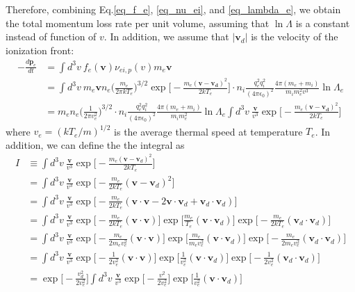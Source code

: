 \documentclass{article}
\begin{document}
Therefore, combining Eq.\ref{eq_f_e}, \ref{eq_nu_ei}, and \ref{eq_lambda_e}, we obtain the total momentum loss rate per unit volume, assuming that $\ln \Lambda$ is a constant instead of function of $v$. In addition, we assume that $|\bm{v}_d|$ is the velocity of the ionization front:
\begin{equation}
	\begin{split}
		-\frac{d \bm{p}_e}{d t} &= \int d^3v\ f_e(\bm{v}) \nu_{ei,p} (v) m_e \bm{v}\\
		&= \int d^3v\ m_e\bm{v} n_e \Big(\frac{m_e}{2\pi kT_e} \Big)^{3/2} \exp\Big[-\frac{m_e(\bm{v} - \bm{v_d})^2}{2kT_e} \Big] \cdot n_i\frac{q_e^2 q_i^2}{(4\pi \epsilon_0 )^2}\frac{4\pi(m_e+m_i)}{m_i m_e^2 v^3} \ln \Lambda_e \\
		&= m_e n_e \Big(\frac{1}{2\pi v_e^2} \Big)^{3/2} \cdot n_i\frac{q_e^2 q_i^2}{(4\pi \epsilon_0 )^2}\frac{4\pi(m_e+m_i)}{m_i m_e^2} \ln \Lambda_e \int d^3v\ \frac{\bm{v}}{v^3} \exp\Big[-\frac{m_e(\bm{v} - \bm{v_d})^2}{2kT_e} \Big] 
	\end{split}
\end{equation}
where $v_e = (kT_e/m )^{1/2}$ is the average thermal speed at temperature $T_e$. In addition, we can define the the integral as
\begin{equation}
	\begin{split}
		I &\equiv \int d^3v\ \frac{\bm{v}}{v^3} \exp\Big[-\frac{m_e(\bm{v} - \bm{v}_d)^2}{2kT_e} \Big] \\
		&= \int d^3v\ \frac{\bm{v}}{v^3} \exp\Big[-\frac{m_e}{2kT_e}(\bm{v} - \bm{v}_d)^2 \Big]\\
		&= \int d^3v\ \frac{\bm{v}}{v^3} \exp\Big[-\frac{m_e}{2kT_e}(\bm{v}\cdot\bm{v} - 2\bm{v}\cdot\bm{v}_d + \bm{v}_d\cdot\bm{v}_d) \Big] \\
		&= \int d^3v\ \frac{\bm{v}}{v^3} \exp\Big[-\frac{m_e}{2kT_e}(\bm{v}\cdot\bm{v}) \Big] \exp\Big[\frac{m_e}{T_e}(\bm{v}\cdot\bm{v}_d ) \Big] \exp\Big[-\frac{m_e}{2kT_e}(\bm{v}_d\cdot\bm{v}_d) \Big] \\
		&= \int d^3v\ \frac{\bm{v}}{v^3} \exp\Big[-\frac{m_e}{2m_ev_e^2}(\bm{v}\cdot\bm{v}) \Big] \exp\Big[\frac{m_e}{m_e v_e^2}(\bm{v}\cdot\bm{v}_d ) \Big] \exp\Big[-\frac{m_e}{2m_ev_e^2}(\bm{v}_d\cdot\bm{v}_d) \Big] \\
		&= \int d^3v\ \frac{\bm{v}}{v^3} \exp\Big[-\frac{1}{2v_e^2}(\bm{v}\cdot\bm{v}) \Big] \exp\Big[\frac{1}{v_e^2}(\bm{v}\cdot\bm{v}_d ) \Big] \exp\Big[-\frac{1}{2v_e^2}(\bm{v}_d\cdot\bm{v}_d) \Big]\\
		&= \exp\Big[-\frac{v_d^2}{2v_e^2} \Big] \int d^3v\ \frac{\bm{v}}{v^3} \exp\Big[-\frac{v^2}{2v_e^2} \Big] \exp\Big[\frac{1}{v_e^2}(\bm{v}\cdot\bm{v}_d ) \Big]
 	\end{split}
\end{equation}
\end{document}
